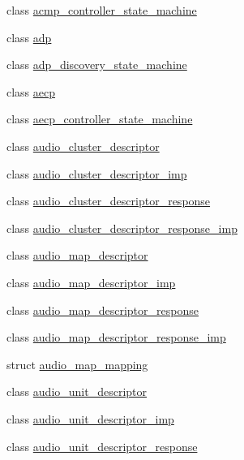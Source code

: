 \begin{DoxyCompactItemize}
\item 
class \hyperlink{classavdecc__lib_1_1acmp__controller__state__machine}{acmp\+\_\+controller\+\_\+state\+\_\+machine}
\item 
class \hyperlink{classavdecc__lib_1_1adp}{adp}
\item 
class \hyperlink{classavdecc__lib_1_1adp__discovery__state__machine}{adp\+\_\+discovery\+\_\+state\+\_\+machine}
\item 
class \hyperlink{classavdecc__lib_1_1aecp}{aecp}
\item 
class \hyperlink{classavdecc__lib_1_1aecp__controller__state__machine}{aecp\+\_\+controller\+\_\+state\+\_\+machine}
\item 
class \hyperlink{classavdecc__lib_1_1audio__cluster__descriptor}{audio\+\_\+cluster\+\_\+descriptor}
\item 
class \hyperlink{classavdecc__lib_1_1audio__cluster__descriptor__imp}{audio\+\_\+cluster\+\_\+descriptor\+\_\+imp}
\item 
class \hyperlink{classavdecc__lib_1_1audio__cluster__descriptor__response}{audio\+\_\+cluster\+\_\+descriptor\+\_\+response}
\item 
class \hyperlink{classavdecc__lib_1_1audio__cluster__descriptor__response__imp}{audio\+\_\+cluster\+\_\+descriptor\+\_\+response\+\_\+imp}
\item 
class \hyperlink{classavdecc__lib_1_1audio__map__descriptor}{audio\+\_\+map\+\_\+descriptor}
\item 
class \hyperlink{classavdecc__lib_1_1audio__map__descriptor__imp}{audio\+\_\+map\+\_\+descriptor\+\_\+imp}
\item 
class \hyperlink{classavdecc__lib_1_1audio__map__descriptor__response}{audio\+\_\+map\+\_\+descriptor\+\_\+response}
\item 
class \hyperlink{classavdecc__lib_1_1audio__map__descriptor__response__imp}{audio\+\_\+map\+\_\+descriptor\+\_\+response\+\_\+imp}
\item 
struct \hyperlink{structavdecc__lib_1_1audio__map__mapping}{audio\+\_\+map\+\_\+mapping}
\item 
class \hyperlink{classavdecc__lib_1_1audio__unit__descriptor}{audio\+\_\+unit\+\_\+descriptor}
\item 
class \hyperlink{classavdecc__lib_1_1audio__unit__descriptor__imp}{audio\+\_\+unit\+\_\+descriptor\+\_\+imp}
\item 
class \hyperlink{classavdecc__lib_1_1audio__unit__descriptor__response}{audio\+\_\+unit\+\_\+descriptor\+\_\+response}

\end{DoxyCompactItemize}
